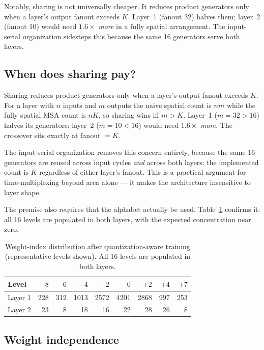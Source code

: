 \documentclass[conference]{IEEEtran}
\begin{document}
Notably, sharing is not universally cheaper. It reduces product generators only
when a layer's output fanout exceeds $K$. Layer~1 (fanout 32) halves them;
layer~2 (fanout 10) would need $1.6\times$ \emph{more} in a fully spatial
arrangement. The input-serial organization sidesteps this because the same 16
generators serve both layers.

\subsection{When does sharing pay?}

Sharing reduces product generators only when a layer's output fanout exceeds
$K$. For a layer with $n$ inputs and $m$ outputs the naive spatial count is
$nm$ while the fully spatial MSA count is $nK$, so sharing wins iff $m > K$.
Layer~1 ($m{=}32 > 16$) halves its generators; layer~2 ($m{=}10 < 16$) would
need $1.6\times$ \emph{more}. The crossover sits exactly at fanout $= K$.

The input-serial organization removes this concern entirely, because the same
16 generators are reused across input cycles \emph{and} across both layers: the
implemented count is $K$ regardless of either layer's fanout. This is a
practical argument for time-multiplexing beyond area alone --- it makes the
architecture insensitive to layer shape.

The premise also requires that the alphabet actually be used.
Table~\ref{tab:hist} confirms it: all 16 levels are populated in both layers,
with the expected concentration near zero.

\begin{table}[t]
\centering
\caption{Weight-index distribution after quantization-aware training
(representative levels shown). All 16 levels are populated in both layers.}
\label{tab:hist}
\footnotesize
\begin{tabular}{@{}lrrrrrrrr@{}}
\toprule
Level & $-8$ & $-6$ & $-4$ & $-2$ & $0$ & $+2$ & $+4$ & $+7$ \\
\midrule
Layer 1 & 228 & 312 & 1013 & 2572 & 4201 & 2868 & 997 & 253 \\
Layer 2 & 23 & 8 & 18 & 16 & 22 & 28 & 26 & 8 \\
\bottomrule
\end{tabular}
\end{table}

\subsection{Weight independence}
\end{document}
